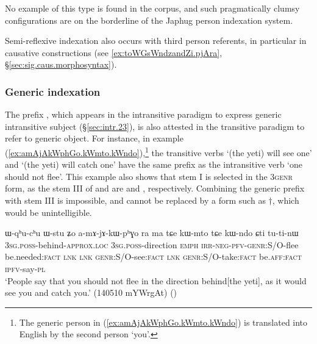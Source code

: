 No example of this type is found in the corpus, and  such pragmatically clumsy configurations are on the borderline of the  Japhug person indexation system.

Semi-reflexive indexation also occurs with third person referents, in particular in causative constructions (see \ref{ex:toWGsWndzandZi.pjAra}, §\ref{sec:sig.caus.morphosyntax}).
 
\subsubsection{Generic indexation} \label{sec:indexation.generic.tr}
The prefix , which appears in the intransitive paradigm to express generic intransitive subject (§\ref{sec:intr.23}), is also attested in the transitive paradigm to refer to generic object. For instance, in example (\ref{ex:amAjAkWphGo.kWmto.kWndo}),\footnote{The generic person in (\ref{ex:amAjAkWphGo.kWmto.kWndo}) is translated into English by the second person `you'. } the transitive verbs  `(the yeti) will see one' and  `(the yeti) will catch one' have the same  prefix as the intransitive verb  `one should not flee'. This example also shows that stem I is selected in the 3\fl{}\textsc{genr} form, as the stem III of  and  are  and , respectively. Combining the generic  prefix with stem III is impossible, and  cannot be replaced by a form such as $\dagger$, which would be unintelligible.

\begin{exe}
\ex   \label{ex:amAjAkWphGo.kWmto.kWndo}
\gll ɯ-qʰu-cʰu ɯ-stu ʑo a-mɤ-jɤ-kɯ-pʰɣo ra ma tɕe kɯ-mto tɕe kɯ-ndo ɕti tu-ti-nɯ \\
\textsc{3sg}.\textsc{poss}-behind-\textsc{approx}.\textsc{loc}  \textsc{3sg}.\textsc{poss}-direction \textsc{emph} \textsc{irr}-\textsc{neg}-\textsc{pfv}-\textsc{genr}:S/O-flee be.needed:\textsc{fact} \textsc{lnk} \textsc{lnk}
\textsc{genr}:S/O-see:\textsc{fact} \textsc{lnk} \textsc{genr}:S/O-take:\textsc{fact} be.\textsc{aff}:\textsc{fact} \textsc{ipfv}-say-\textsc{pl} \\
\glt `People say that you should not flee in the direction behind[the yeti], as it would see you and catch you.' (140510 mYWrgAt)
()
\end{exe}

